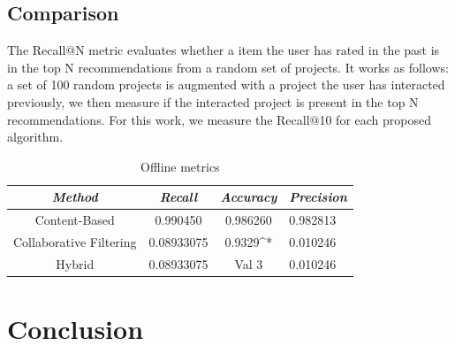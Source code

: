 \documentclass[cic,tc,english]{iiufrgs}
\begin{document}
\section{Comparison}
The Recall@N metric evaluates whether a item the user has rated in the past is in the top N recommendations from a random set of projects. It works as follows: a set of 100 random projects is augmented with a project the user has interacted previously, we then measure if the interacted project is present in the top N recommendations. For this work, we measure the Recall@10 for each proposed algorithm.
\begin{table}[h]
    \caption{Offline metrics}
    \centering
        \begin{tabular}{c|c|c|p{5cm}}
          \hline
          \textit{Method}  &   \textit{Recall}  &   \textit{Accuracy}  &   \textit{Precision} \\
          \hline
          \hline
          Content-Based           &   0.990450           & 0.986260 &  0.982813 \\
          Collaborative Filtering     & 0.08933075             & 0.9329^*  & 0.010246\\
          Hybrid     & 0.08933075             & Val 3  & 0.010246\\
          \hline
        \end{tabular}
    \label{tbl:offline_metrics}
\end{table}

\chapter{Conclusion}

% 


{}
\end{document}
